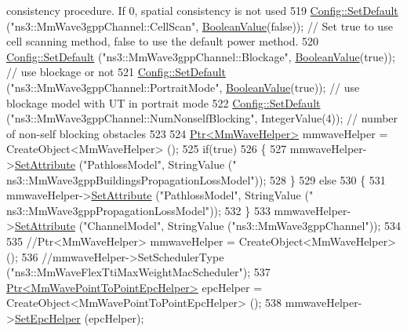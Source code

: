 \begin{DoxyCode}
{{       consistency procedure. If 0, spatial consistency is not used}
519   \hyperlink{group__config_ga2e7882df849d8ba4aaad31c934c40c06}{Config::SetDefault} (\textcolor{stringliteral}{"ns3::MmWave3gppChannel::CellScan"}, 
      \hyperlink{classns3_1_1BooleanValue}{BooleanValue}(\textcolor{keyword}{false})); \textcolor{comment}{// Set true to use cell scanning method, false to use the default power
       method.}
520   \hyperlink{group__config_ga2e7882df849d8ba4aaad31c934c40c06}{Config::SetDefault} (\textcolor{stringliteral}{"ns3::MmWave3gppChannel::Blockage"}, 
      \hyperlink{classns3_1_1BooleanValue}{BooleanValue}(\textcolor{keyword}{true})); \textcolor{comment}{// use blockage or not}
521   \hyperlink{group__config_ga2e7882df849d8ba4aaad31c934c40c06}{Config::SetDefault} (\textcolor{stringliteral}{"ns3::MmWave3gppChannel::PortraitMode"}, 
      \hyperlink{classns3_1_1BooleanValue}{BooleanValue}(\textcolor{keyword}{true})); \textcolor{comment}{// use blockage model with UT in portrait mode}
522   \hyperlink{group__config_ga2e7882df849d8ba4aaad31c934c40c06}{Config::SetDefault} (\textcolor{stringliteral}{"ns3::MmWave3gppChannel::NumNonselfBlocking"}, IntegerValue(4)); \textcolor{comment}{//
       number of non-self blocking obstacles}
523 
524   \hyperlink{classns3_1_1Ptr}{Ptr<MmWaveHelper>} mmwaveHelper = CreateObject<MmWaveHelper> (); 
525   \textcolor{keywordflow}{if}(\textcolor{keyword}{true})
526   \{
527     mmwaveHelper->\hyperlink{classns3_1_1ObjectBase_ac60245d3ea4123bbc9b1d391f1f6592f}{SetAttribute} (\textcolor{stringliteral}{"PathlossModel"}, StringValue (\textcolor{stringliteral}{"
      ns3::MmWave3gppBuildingsPropagationLossModel"}));
528   \}
529   \textcolor{keywordflow}{else}
530   \{
531     mmwaveHelper->\hyperlink{classns3_1_1ObjectBase_ac60245d3ea4123bbc9b1d391f1f6592f}{SetAttribute} (\textcolor{stringliteral}{"PathlossModel"}, StringValue (\textcolor{stringliteral}{"
      ns3::MmWave3gppPropagationLossModel"}));
532   \}
533   mmwaveHelper->\hyperlink{classns3_1_1ObjectBase_ac60245d3ea4123bbc9b1d391f1f6592f}{SetAttribute} (\textcolor{stringliteral}{"ChannelModel"}, StringValue (\textcolor{stringliteral}{"ns3::MmWave3gppChannel"}));
534 
535   \textcolor{comment}{//Ptr<MmWaveHelper> mmwaveHelper = CreateObject<MmWaveHelper> ();}
536   \textcolor{comment}{//mmwaveHelper->SetSchedulerType ("ns3::MmWaveFlexTtiMaxWeightMacScheduler");}
537   \hyperlink{classns3_1_1Ptr}{Ptr<MmWavePointToPointEpcHelper>} epcHelper = 
      CreateObject<MmWavePointToPointEpcHelper> ();
538   mmwaveHelper->\hyperlink{classns3_1_1MmWaveHelper_a54fc98a649a710153b479d0878558733}{SetEpcHelper} (epcHelper);
}
\end{DoxyCode}
